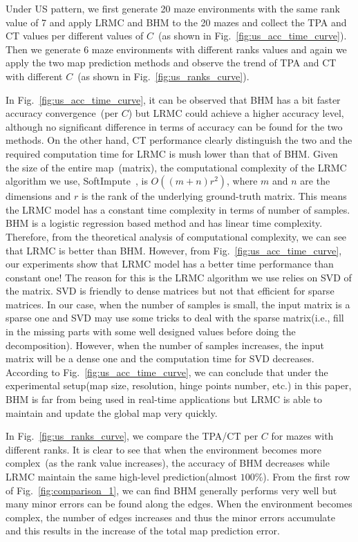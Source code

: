 Under US pattern, we first generate 20 maze environments with the same rank value of 7 and apply LRMC and BHM to the 20 mazes and collect the TPA and CT values per different values of $C$~(as shown in Fig.~\ref{fig:us_acc_time_curve}). Then we generate 6 maze environments with different ranks values and again we apply the two map prediction methods and observe the trend of TPA and CT with different $C$~(as shown in Fig.~\ref{fig:us_ranks_curve}). 

In Fig.~\ref{fig:us_acc_time_curve}, it can be observed that BHM has a bit faster accuracy convergence~(per $C$) but LRMC could achieve a higher accuracy level, although no significant difference in terms of accuracy can be found for the two methods. On the other hand, CT performance clearly distinguish the two and the required computation time for LRMC is mush lower than that of BHM. Given the size of the entire map~(matrix), the computational complexity of the LRMC algorithm we use, SoftImpute~\cite{mazumder2010spectral}, is $O((m+n)r^2)$, where $m$ and $n$ are the dimensions and $r$ is the rank of the underlying ground-truth matrix. This means the LRMC model has a constant time complexity in terms of number of samples. BHM is a logistic regression based method and has linear time complexity. Therefore, from the theoretical analysis of computational complexity, we can see that LRMC is better than BHM. However, from Fig.~\ref{fig:us_acc_time_curve}, our experiments show that LRMC model has a better time performance than constant one! The reason for this is the LRMC algorithm we use relies on SVD of the matrix. SVD is friendly to dense matrices but not that efficient for sparse matrices. In our case, when the number of samples is small, the input matrix is a sparse one and SVD may use some tricks to deal with the sparse matrix(i.e., fill in the missing parts with some well designed values before doing the decomposition). However, when the number of samples increases, the input matrix will be a dense one and the computation time for SVD decreases. According to Fig.~\ref{fig:us_acc_time_curve}, we can conclude that under the experimental setup(map size, resolution, hinge points number, etc.) in this paper, BHM is far from being used in real-time applications but LRMC is able to maintain and update the global map very quickly.

In Fig.~\ref{fig:us_ranks_curve}, we compare the TPA/CT per $C$ for mazes with different ranks. It is clear to see that when the environment becomes more complex~(as the rank value increases), the accuracy of BHM decreases while LRMC maintain the same high-level prediction(almost $100\%$). From the first row of Fig.~\ref{fig:comparison_1}, we can find BHM generally performs very well but many minor errors can be found along the edges. When the environment becomes complex, the number of edges increases and thus the minor errors accumulate and this results in the increase of the total map prediction error.

